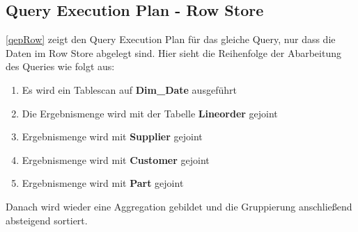 \subsection{Query Execution Plan - Row Store}
\autoref{qepRow} zeigt den Query Execution Plan für das gleiche Query, nur dass die Daten im Row Store abgelegt sind. Hier sieht die Reihenfolge der Abarbeitung des Queries wie folgt aus:
\begin{enumerate}
	\item Es wird ein Tablescan auf \textbf{Dim\_Date} ausgeführt
	\item Die Ergebnismenge wird mit der Tabelle \textbf{Lineorder} gejoint
	\item Ergebnismenge wird mit \textbf{Supplier } gejoint
	\item  Ergebnismenge wird mit \textbf{Customer } gejoint
	\item  Ergebnismenge wird mit \textbf{Part } gejoint
\end{enumerate}
Danach wird wieder eine Aggregation gebildet und die Gruppierung anschließend absteigend sortiert.
